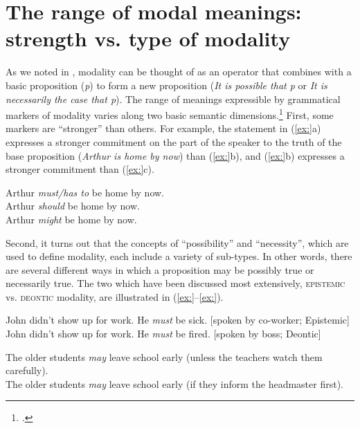 \section{The range of modal meanings: strength vs. type of modality}\label{sec:16.2}

As we noted in , modality can be thought of as an operator that combines with a basic proposition (\textit{p}) to form a new proposition (\textit{It is possible that p} or \textit{It is necessarily the case that p}). The range of meanings expressible by grammatical markers of modality varies along two basic semantic dimensions.\footnote{\citet{Hacquard2011}.} First, some markers are “stronger” than others. For example, the statement in (\ref{ex:}a) expresses a stronger commitment on the part of the speaker to the truth of the base proposition (\textit{Arthur is home by now}) than (\ref{ex:}b), and (\ref{ex:}b) expresses a stronger commitment than (\ref{ex:}c).


\ea
\ea Arthur \textit{must/has to} be home by now.\\
\ex Arthur \textit{should} be home by now.\\
\ex Arthur \textit{might} be home by now.
                       \z
\z


Second, it turns out that the concepts of “possibility” and “necessity”, which are used to define modality, each include a variety of sub-types. In other words, there are several different ways in which a proposition may be possibly true or necessarily true. The two which have been discussed most extensively, \textsc{epistemic} vs. \textsc{deontic} modality, are illustrated in (\ref{ex:}--\ref{ex:}).


\ea
\ea John didn’t show up for work. He \textit{must} be sick.  [spoken by co-worker; Epistemic]\\
\ex John didn’t show up for work. He \textit{must} be fired.  [spoken by boss; Deontic]
                       \z
\z

\ea
\ea The older students \textit{may} leave school early (unless the teachers watch them carefully).\\
\ex The older students \textit{may} leave school early (if they inform the headmaster first).
                       \z
\z


